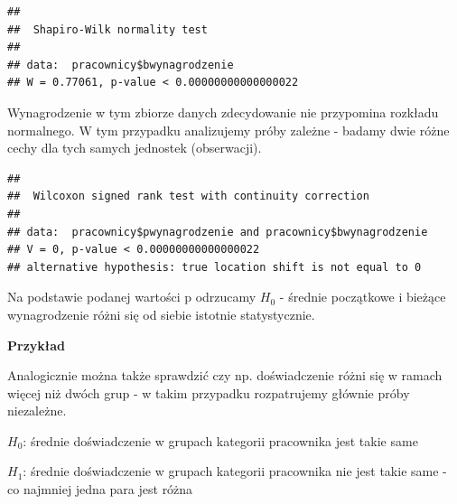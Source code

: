 \documentclass[]{book}
\newenvironment{Shaded}{\begin{snugshade}}{\end{snugshade}}
\newcommand{\DataTypeTok}[1]{\textcolor[rgb]{0.13,0.29,0.53}{#1}}
\newcommand{\KeywordTok}[1]{\textcolor[rgb]{0.13,0.29,0.53}{\textbf{#1}}}
\newcommand{\NormalTok}[1]{#1}
\newcommand{\OperatorTok}[1]{\textcolor[rgb]{0.81,0.36,0.00}{\textbf{#1}}}
\newcommand{\OtherTok}[1]{\textcolor[rgb]{0.56,0.35,0.01}{#1}}
\newcommand{\StringTok}[1]{\textcolor[rgb]{0.31,0.60,0.02}{#1}}
\begin{document}
\begin{Shaded}
\end{Shaded}

\begin{verbatim}
## 
##  Shapiro-Wilk normality test
## 
## data:  pracownicy$bwynagrodzenie
## W = 0.77061, p-value < 0.00000000000000022
\end{verbatim}

Wynagrodzenie w tym zbiorze danych zdecydowanie nie przypomina rozkładu normalnego. W tym przypadku analizujemy próby zależne - badamy dwie różne cechy dla tych samych jednostek (obserwacji).

\begin{Shaded}
\end{Shaded}

\begin{verbatim}
## 
##  Wilcoxon signed rank test with continuity correction
## 
## data:  pracownicy$pwynagrodzenie and pracownicy$bwynagrodzenie
## V = 0, p-value < 0.00000000000000022
## alternative hypothesis: true location shift is not equal to 0
\end{verbatim}

Na podstawie podanej wartości p odrzucamy \(H_0\) - średnie początkowe i bieżące wynagrodzenie różni się od siebie istotnie statystycznie.

\textbf{Przykład}

Analogicznie można także sprawdzić czy np. doświadczenie różni się w ramach więcej niż dwóch grup - w takim przypadku rozpatrujemy głównie próby niezależne.

\(H_0\): średnie doświadczenie w grupach kategorii pracownika jest takie same

\(H_1\): średnie doświadczenie w grupach kategorii pracownika nie jest takie same - co najmniej jedna para jest różna

\begin{Shaded}
\end{Shaded}
\end{document}
